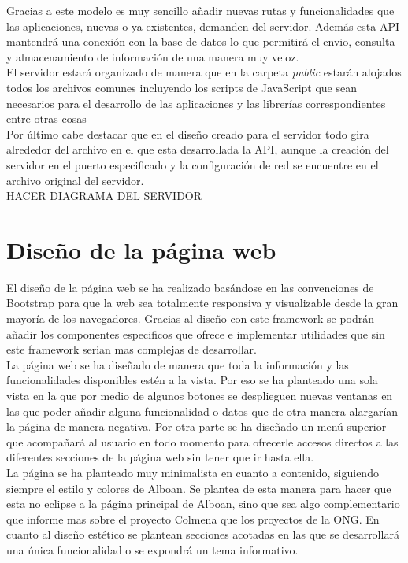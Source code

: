 Gracias a este modelo es muy sencillo añadir nuevas rutas y funcionalidades que las aplicaciones, nuevas o ya existentes, demanden del servidor. Además esta API mantendrá una conexión con la base de datos lo que permitirá el envio, consulta y almacenamiento de información de una manera muy veloz.\\

El servidor estará organizado de manera que en la carpeta \textit{public} estarán alojados todos los archivos comunes incluyendo los scripts de JavaScript que sean necesarios para el desarrollo de las aplicaciones y las librerías correspondientes entre otras cosas\\

Por último cabe destacar que en el diseño creado para el servidor todo gira alrededor del archivo en el que esta desarrollada la API, aunque la creación del servidor en el puerto especificado y la configuración de red se encuentre en el archivo original del servidor.\\

HACER DIAGRAMA DEL SERVIDOR

\section{Diseño de la página web}
El diseño de la página web se ha realizado basándose en las convenciones de Bootstrap para que la web sea totalmente responsiva y visualizable desde la gran mayoría de los navegadores. Gracias al diseño con este framework se podrán añadir los componentes especificos que ofrece e implementar utilidades que sin este framework serian mas complejas de desarrollar.\\

La página web se ha diseñado de manera que toda la información y las funcionalidades disponibles estén a la vista. Por eso se ha planteado una sola vista en la que por medio de algunos botones se desplieguen nuevas ventanas en las que poder añadir alguna funcionalidad o datos que de otra manera alargarían la página de manera negativa. Por otra parte se ha diseñado un menú superior que acompañará al usuario en todo momento para ofrecerle accesos directos a las diferentes secciones de la página web sin tener que ir hasta ella.\\

La página se ha planteado muy minimalista en cuanto a contenido, siguiendo siempre el estilo y colores de Alboan. Se plantea de esta manera para hacer que esta no eclipse a la página principal de Alboan, sino que sea algo complementario que informe mas sobre el proyecto Colmena que los proyectos de la ONG. En cuanto al diseño estético se plantean secciones acotadas en las que se desarrollará una única funcionalidad o se expondrá un tema informativo.\\

